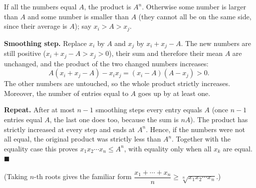 If all the numbers equal $A$, the product is $A^n$. Otherwise some number is larger than $A$ and some number is smaller than $A$ (they cannot all be on the same side, since their average is $A$); say $x_i>A>x_j$.

\textbf{Smoothing step.} Replace $x_i$ by $A$ and $x_j$ by $x_i+x_j-A$. The new numbers are still positive ($x_i+x_j-A>x_j>0$), their sum and therefore their mean $A$ are unchanged, and the product of the two changed numbers increases:
\[
A(x_i+x_j-A)-x_ix_j=(x_i-A)(A-x_j)>0 .
\]
The other numbers are untouched, so the whole product strictly increases. Moreover, the number of entries equal to $A$ goes up by at least one.

\textbf{Repeat.} After at most $n-1$ smoothing steps every entry equals $A$ (once $n-1$ entries equal $A$, the last one does too, because the sum is $nA$). The product has strictly increased at every step and ends at $A^n$. Hence, if the numbers were not all equal, the original product was strictly less than $A^n$. Together with the equality case this proves $x_1x_2\cdots x_n\le A^n$, with equality only when all $x_k$ are equal. $\blacksquare$

(Taking $n$-th roots gives the familiar form $\dfrac{x_1+\cdots+x_n}{n}\ge\sqrt[n]{x_1x_2\cdots x_n}$.)
